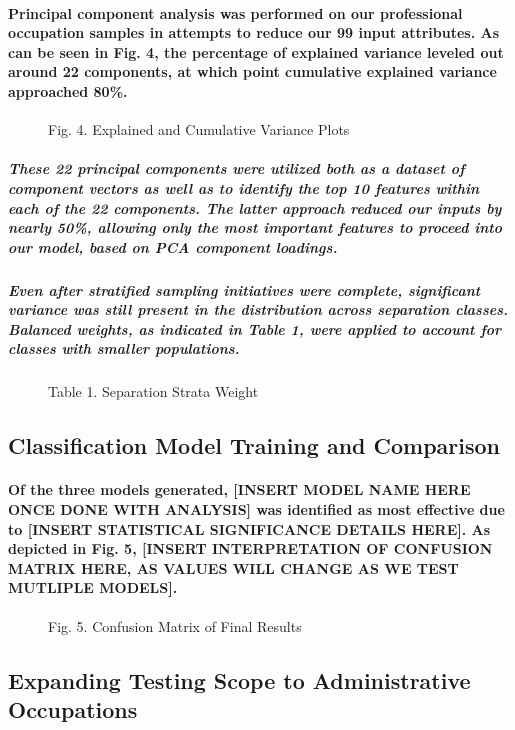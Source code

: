 \documentclass{article}
\begin{document}
\paragraph{Principal component analysis was performed on our professional occupation samples in attempts to reduce our 99 input attributes. As can be seen in Fig. 4, the percentage of explained variance leveled out around 22 components, at which point cumulative explained variance approached 80\%.}

\begin{figure}
\caption{Fig. 4. Explained and Cumulative Variance Plots}
\end{figure}

\subparagraph{These 22 principal components were utilized both as a dataset of component vectors as well as to identify the top 10 features within each of the 22 components. The latter approach reduced our inputs by nearly 50\%, allowing only the most important features to proceed into our model, based on PCA component loadings.}
 
\subparagraph{Even after stratified sampling initiatives were complete, significant variance was still present in the distribution across separation classes. Balanced weights, as indicated in Table 1, were applied to account for classes with smaller populations.}

\begin{figure}
\caption{Table 1. Separation Strata Weight}
\end{figure}

\subsection{Classification Model Training and Comparison}

\paragraph{Of the three models generated, [INSERT MODEL NAME HERE ONCE DONE WITH ANALYSIS] was identified as most effective due to [INSERT STATISTICAL SIGNIFICANCE DETAILS HERE]. As depicted in Fig. 5, [INSERT INTERPRETATION OF CONFUSION MATRIX HERE, AS VALUES WILL CHANGE AS WE TEST MUTLIPLE MODELS].}
 
\begin{figure}
\caption{Fig. 5. Confusion Matrix of Final Results}
\end{figure}
 
\subsection{Expanding Testing Scope to Administrative Occupations}
\end{document}
